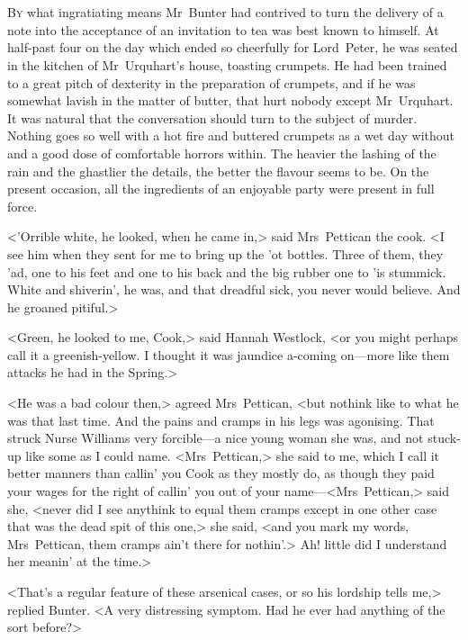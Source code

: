 \chapter[Chapter \thechapter]{}
\lettrine{B}{y} what ingratiating means Mr~Bunter had contrived to turn the delivery of a note into the acceptance of an invitation to tea was best known to himself. At half-past four on the day which ended so cheerfully for Lord~Peter, he was seated in the kitchen of Mr~Urquhart's house, toasting crumpets. He had been trained to a great pitch of dexterity in the preparation of crumpets, and if he was somewhat lavish in the matter of butter, that hurt nobody except Mr~Urquhart. It was natural that the conversation should turn to the subject of murder. Nothing goes so well with a hot fire and buttered crumpets as a wet day without and a good dose of comfortable horrors within. The heavier the lashing of the rain and the ghastlier the details, the better the flavour seems to be. On the present occasion, all the ingredients of an enjoyable party were present in full force.

<'Orrible white, he looked, when he came in,> said Mrs~Pettican the cook. <I see him when they sent for me to bring up the 'ot bottles. Three of them, they 'ad, one to his feet and one to his back and the big rubber one to 'is stummick. White and shiverin', he was, and that dreadful sick, you never would believe. And he groaned pitiful.>

<Green, he looked to me, Cook,> said Hannah Westlock, <or you might perhaps call it a greenish-yellow. I thought it was jaundice a-coming on—more like them attacks he had in the Spring.>

<He was a bad colour then,> agreed Mrs~Pettican, <but nothink like to what he was that last time. And the pains and cramps in his legs was agonising. That struck Nurse Williams very forcible—a nice young woman she was, and not stuck-up like some as I could name. <Mrs~Pettican,> she said to me, which I call it better manners than callin' you Cook as they mostly do, as though they paid your wages for the right of callin' you out of your name—<Mrs~Pettican,> said she, <never did I see anythink to equal them cramps except in one other case that was the dead spit of this one,> she said, <and you mark my words, Mrs~Pettican, them cramps ain't there for nothin'.> Ah! little did I understand her meanin' at the time.>

<That's a regular feature of these arsenical cases, or so his lordship tells me,> replied Bunter. <A very distressing symptom. Had he ever had anything of the sort before?>

